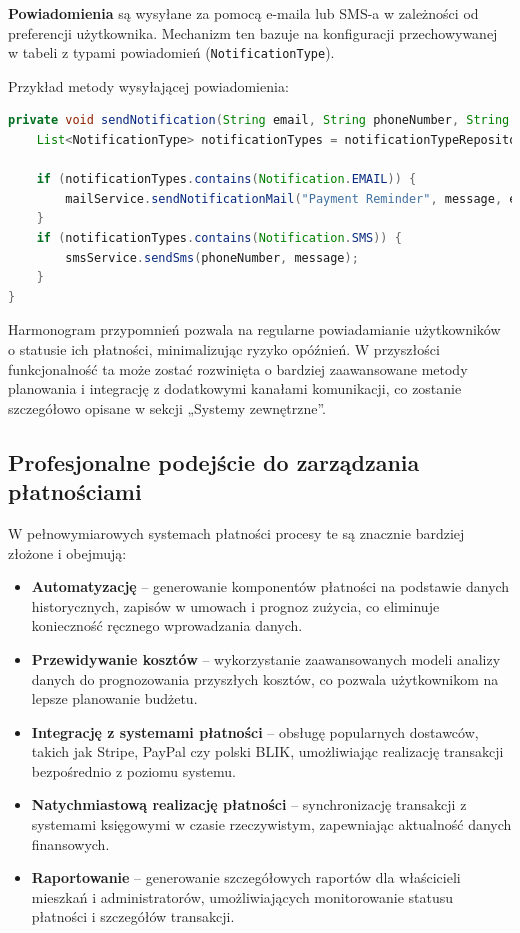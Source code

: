 \textbf{Powiadomienia} są wysyłane za pomocą e-maila lub SMS-a w zależności od preferencji użytkownika. Mechanizm ten bazuje na konfiguracji przechowywanej w tabeli z typami powiadomień (\texttt{NotificationType}).

Przykład metody wysyłającej powiadomienia:
\begin{lstlisting}[language=Java, style=JavaStyle, caption=Wysyłanie powiadomień]
private void sendNotification(String email, String phoneNumber, String message) {
    List<NotificationType> notificationTypes = notificationTypeRepository.findByUserEmail(email);

    if (notificationTypes.contains(Notification.EMAIL)) {
        mailService.sendNotificationMail("Payment Reminder", message, email);
    }
    if (notificationTypes.contains(Notification.SMS)) {
        smsService.sendSms(phoneNumber, message);
    }
}
\end{lstlisting}

Harmonogram przypomnień pozwala na regularne powiadamianie użytkowników o statusie ich płatności, minimalizując ryzyko opóźnień. W przyszłości funkcjonalność ta może zostać rozwinięta o bardziej zaawansowane metody planowania i integrację z dodatkowymi kanałami komunikacji, co zostanie szczegółowo opisane w sekcji „Systemy zewnętrzne”.

\subsection{Profesjonalne podejście do zarządzania płatnościami}

W pełnowymiarowych systemach płatności procesy te są znacznie bardziej złożone i obejmują:
\begin{itemize}
    \item \textbf{Automatyzację} -- generowanie komponentów płatności na podstawie danych historycznych, zapisów w umowach i prognoz zużycia, co eliminuje konieczność ręcznego wprowadzania danych.
    \item \textbf{Przewidywanie kosztów} -- wykorzystanie zaawansowanych modeli analizy danych do prognozowania przyszłych kosztów, co pozwala użytkownikom na lepsze planowanie budżetu.
    \item \textbf{Integrację z systemami płatności} -- obsługę popularnych dostawców, takich jak Stripe, PayPal czy polski BLIK, umożliwiając realizację transakcji bezpośrednio z poziomu systemu.
    \item \textbf{Natychmiastową realizację płatności} -- synchronizację transakcji z systemami księgowymi w czasie rzeczywistym, zapewniając aktualność danych finansowych.
    \item \textbf{Raportowanie} -- generowanie szczegółowych raportów dla właścicieli mieszkań i administratorów, umożliwiających monitorowanie statusu płatności i szczegółów transakcji.
\end{itemize}

